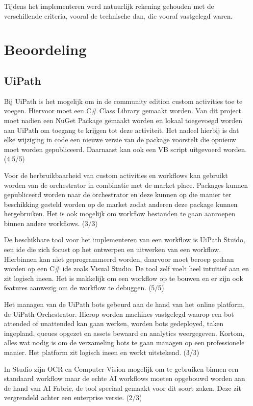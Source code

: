 Tijdens het implementeren werd natuurlijk rekening gehouden met de verschillende criteria, vooral de technische dan, die vooraf vastgelegd waren.

\section{Beoordeling}
\subsection{UiPath}
Bij UiPath is het mogelijk om in de community edition custom activities toe te voegen. Hiervoor moet een C\# Class Library gemaakt worden. Van dit project moet nadien een NuGet Package gemaakt worden en lokaal toegevoegd worden aan UiPath om toegang te krijgen tot deze activiteit. Het nadeel hierbij is dat elke wijziging in code een nieuwe versie van de package voorstelt die opnieuw moet worden gepubliceerd. Daarnaast kan ook een VB script uitgevoerd worden. (4.5/5)

Voor de herbruikbaarheid van custom activities en workflows kan gebruikt worden van de orchestrator in combinatie met de market place. Packages kunnen gepubliceerd worden naar de orchestrator en deze kunnen op die manier ter beschikking gesteld worden op de market zodat anderen deze package kunnen hergebruiken. Het is ook mogelijk om workflow bestanden te gaan aanroepen binnen andere workflows. (3/3) 

De beschikbare tool voor het implementeren van een workflow is UiPath Stuido, een ide die zich focust op het ontwerpen en uitwerken van een workflow. Hierbinnen kan niet geprogrammeerd worden, daarvoor moet beroep gedaan worden op een C\# ide zoals Visual Studio. De tool zelf voelt heel intuïtief aan en zit logisch ineen. Het is makkelijk om een workflow op te bouwen en er zijn ook features aanwezig om de workflow te debuggen. (5/5)

Het managen van de UiPath bots gebeurd aan de hand van het online platform, de UiPath Orchestrator. Hierop worden machines vastgelegd waarop een bot attended of unattended kan gaan werken, worden bots gedeployed, taken ingepland, queues opgezet en assets bewaard en analytics weergegeven. Kortom, alles wat nodig is om de verzameling bots te gaan managen op een professionele manier. Het platform zit logisch ineen en werkt uitstekend. (3/3)

In Studio zijn OCR en Computer Vision mogelijk om te gebruiken binnen een standaard workflow maar de echte AI workflows moeten opgebouwd worden aan de hand van AI Fabric, de tool speciaal gemaakt voor dit soort zaken. Deze zit vergrendeld achter een enterprise versie. (2/3)

